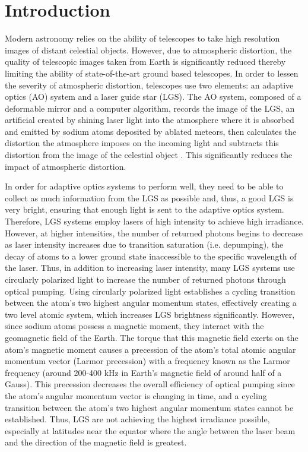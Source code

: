 \documentclass[]{revtex4}
\begin{document}
\maketitle

\section{Introduction}
Modern astronomy relies on the ability of telescopes to take high resolution images of distant celestial objects. However, due to atmospheric distortion, the quality of telescopic images taken from Earth is significantly reduced thereby limiting the ability of state-of-the-art ground based telescopes. In order to lessen the severity of atmospheric distortion, telescopes use two elements: an adaptive optics (AO) system and a laser guide star (LGS). The AO system, composed of a deformable mirror and a computer algorithm, records the image of the LGS, an artificial created by shining laser light into the atmosphere where it is absorbed and emitted by sodium atoms deposited by ablated meteors, then calculates the distortion the atmosphere imposes on the incoming light and subtracts this distortion from the image of the celestial object \cite{Wizinowich2006}. This significantly reduces the impact of atmospheric distortion.

In order for adaptive optics systems to perform well, they need to be able to collect as much information from the LGS as possible and, thus, a good LGS is very bright, ensuring that enough light is sent to the adaptive optics system. Therefore, LGS systems employ lasers of high intensity to achieve high irradiance. However, at higher intensities, the number of returned photons begins to decrease as laser intensity increases due to transition saturation (i.e. depumping), the decay of atoms to a lower ground state inaccessible to the specific wavelength of the laser. Thus, in addition to increasing laser intensity, many LGS systems use circularly polarized light to increase the number of returned photons through optical pumping. Using circularly polarized light establishes a cycling transition between the atom’s two highest angular momentum states, effectively creating a two level atomic system, which increases LGS brightness significantly. However, since sodium atoms possess a magnetic moment, they interact with the geomagnetic field of the Earth. The torque that this magnetic field exerts on the atom’s magnetic moment causes a precession of the atom’s total atomic angular momentum vector (Larmor precession) with a frequency known as the Larmor frequency (around 200-400 kHz in Earth’s magnetic field of around half of a Gauss). This precession decreases the overall efficiency of optical pumping since the atom’s angular momentum vector is changing in time, and a cycling transition between the atom’s two highest angular momentum states cannot be established. Thus, LGS are not achieving the highest irradiance possible, especially at latitudes near the equator where the angle between the laser beam and the direction of the magnetic field is greatest.
\end{document}
